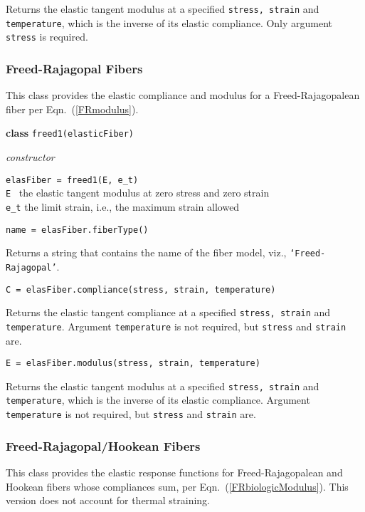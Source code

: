 \medskip\noindent
Returns the elastic tangent modulus at a specified \texttt{stress, strain} and \texttt{temperature}, which is the inverse of its elastic compliance.  Only argument \texttt{stress} is required.


\subsubsection{Freed-Rajagopal Fibers}

This class provides the elastic compliance and modulus for a Freed-Rajagopalean fiber per Eqn.~(\ref{FRmodulus}).

\bigskip\noindent
\textbf{class} \texttt{freed1(elasticFiber)}

\medskip\noindent
\textit{constructor}

\medskip\noindent
\texttt{elasFiber = freed1(E, e\_t)} \\
\indent \texttt{E} \quad\, the elastic tangent modulus at zero stress and zero strain \\
\indent \texttt{e\_t} \: the limit strain, i.e., the maximum strain allowed

\bigskip\noindent
\texttt{name = elasFiber.fiberType()}

\medskip\noindent
Returns a string that contains the name of the fiber model, viz., \texttt{`Freed-Rajagopal'}.

\medskip\noindent
\texttt{C = elasFiber.compliance(stress, strain, temperature)}

\medskip\noindent
Returns the elastic tangent compliance at a specified \texttt{stress, strain} and \texttt{temperature}.  Argument \texttt{temperature} is not required, but \texttt{stress} and \texttt{strain} are.

\medskip\noindent
\texttt{E = elasFiber.modulus(stress, strain, temperature)}

\medskip\noindent
Returns the elastic tangent modulus at a specified \texttt{stress, strain} and \texttt{temperature}, which is the inverse of its elastic compliance.  Argument \texttt{temperature} is not required, but \texttt{stress} and \texttt{strain} are.


\subsubsection{Freed-Rajagopal\slash Hookean Fibers}

This class provides the elastic response functions for Freed-Rajagopalean and Hookean fibers whose compliances sum, per Eqn.~(\ref{FRbiologicModulus}).  This version does not account for thermal straining.

